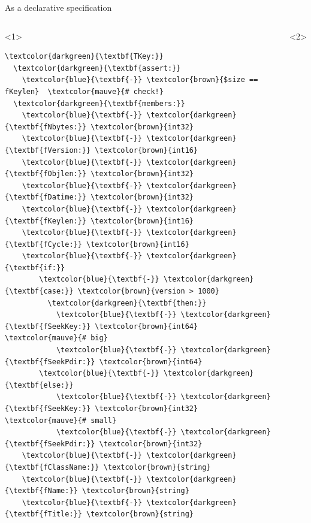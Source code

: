 \documentclass[aspectratio=169]{beamer}
\begin{document}
\begin{frame}[fragile]{As a declarative specification}
\vspace{0.4 cm}

\begin{columns}
\vspace{-0.25 cm}
\scriptsize
\begin{onlyenv}<1>
\begin{Verbatim}[commandchars=\\\{\}]
\textcolor{darkgreen}{\textbf{TKey:}}
  \textcolor{darkgreen}{\textbf{assert:}}
    \textcolor{blue}{\textbf{-}} \textcolor{brown}{$size == fKeylen}  \textcolor{mauve}{# check!}
  \textcolor{darkgreen}{\textbf{members:}}
    \textcolor{blue}{\textbf{-}} \textcolor{darkgreen}{\textbf{fNbytes:}} \textcolor{brown}{int32}
    \textcolor{blue}{\textbf{-}} \textcolor{darkgreen}{\textbf{fVersion:}} \textcolor{brown}{int16}
    \textcolor{blue}{\textbf{-}} \textcolor{darkgreen}{\textbf{fObjlen:}} \textcolor{brown}{int32}
    \textcolor{blue}{\textbf{-}} \textcolor{darkgreen}{\textbf{fDatime:}} \textcolor{brown}{int32}
    \textcolor{blue}{\textbf{-}} \textcolor{darkgreen}{\textbf{fKeylen:}} \textcolor{brown}{int16}
    \textcolor{blue}{\textbf{-}} \textcolor{darkgreen}{\textbf{fCycle:}} \textcolor{brown}{int16}
    \textcolor{blue}{\textbf{-}} \textcolor{darkgreen}{\textbf{if:}}
        \textcolor{blue}{\textbf{-}} \textcolor{darkgreen}{\textbf{case:}} \textcolor{brown}{version > 1000}
          \textcolor{darkgreen}{\textbf{then:}}
            \textcolor{blue}{\textbf{-}} \textcolor{darkgreen}{\textbf{fSeekKey:}} \textcolor{brown}{int64}  \textcolor{mauve}{# big}
            \textcolor{blue}{\textbf{-}} \textcolor{darkgreen}{\textbf{fSeekPdir:}} \textcolor{brown}{int64}
        \textcolor{blue}{\textbf{-}} \textcolor{darkgreen}{\textbf{else:}}
            \textcolor{blue}{\textbf{-}} \textcolor{darkgreen}{\textbf{fSeekKey:}} \textcolor{brown}{int32}  \textcolor{mauve}{# small}
            \textcolor{blue}{\textbf{-}} \textcolor{darkgreen}{\textbf{fSeekPdir:}} \textcolor{brown}{int32}
    \textcolor{blue}{\textbf{-}} \textcolor{darkgreen}{\textbf{fClassName:}} \textcolor{brown}{string}
    \textcolor{blue}{\textbf{-}} \textcolor{darkgreen}{\textbf{fName:}} \textcolor{brown}{string}
    \textcolor{blue}{\textbf{-}} \textcolor{darkgreen}{\textbf{fTitle:}} \textcolor{brown}{string}
\end{Verbatim}
\end{onlyenv}
\begin{onlyenv}<2>
\begin{Verbatim}[commandchars=\\\{\}]

\end{Verbatim}
\end{onlyenv}
\end{columns}
\end{frame}
\end{document}
